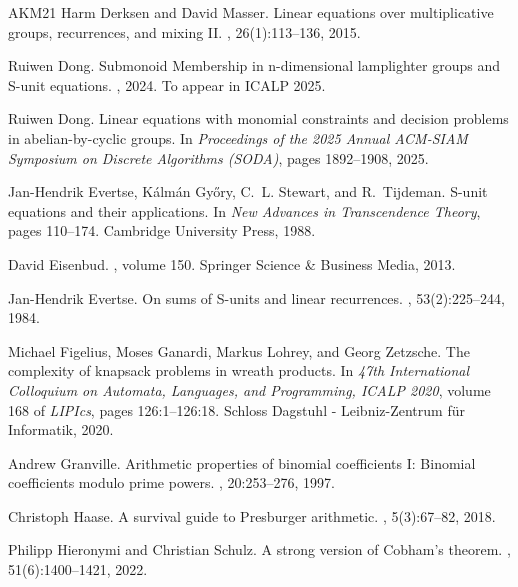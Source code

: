 \documentclass[letterpaper, 11pt, thm-restate]{article}
\numberwithin{equation}{section}
\theoremstyle{definition}
\theoremstyle{definition}
\theoremstyle{definition}
\begin{document}
\begin{thebibliography}{AKM{\etalchar{+}}21}
Harm Derksen and David Masser.
\newblock Linear equations over multiplicative groups, recurrences, and mixing {II}.
, 26(1):113--136, 2015.

Ruiwen Dong.
\newblock Submonoid {M}embership in n-dimensional lamplighter groups and {S}-unit equations.
, 2024.
\newblock To appear in ICALP 2025.

Ruiwen Dong.
\newblock Linear equations with monomial constraints and decision problems in abelian-by-cyclic groups.
\newblock In {\em Proceedings of the 2025 Annual ACM-SIAM Symposium on Discrete Algorithms (SODA)}, pages 1892--1908, 2025.

Jan-Hendrik Evertse, Kálmán Győry, C.~L. Stewart, and R.~Tijdeman.
\newblock S-unit equations and their applications.
\newblock In {\em New Advances in Transcendence Theory}, pages 110--174. Cambridge University Press, 1988.

David Eisenbud.
, volume 150.
\newblock Springer Science \& Business Media, 2013.

Jan-Hendrik Evertse.
\newblock On sums of {S}-units and linear recurrences.
, 53(2):225--244, 1984.

Michael Figelius, Moses Ganardi, Markus Lohrey, and Georg Zetzsche.
\newblock The complexity of knapsack problems in wreath products.
\newblock In {\em 47th International Colloquium on Automata, Languages, and Programming, {ICALP} 2020}, volume 168 of {\em LIPIcs}, pages 126:1--126:18. Schloss Dagstuhl - Leibniz-Zentrum f{\"{u}}r Informatik, 2020.

Andrew Granville.
\newblock Arithmetic properties of binomial coefficients {I}: {B}inomial coefficients modulo prime powers.
, 20:253--276, 1997.

Christoph Haase.
\newblock A survival guide to {P}resburger arithmetic.
, 5(3):67--82, 2018.

Philipp Hieronymi and Christian Schulz.
\newblock A strong version of {C}obham's theorem.
, 51(6):1400--1421, 2022.


\end{thebibliography}
\end{document}
